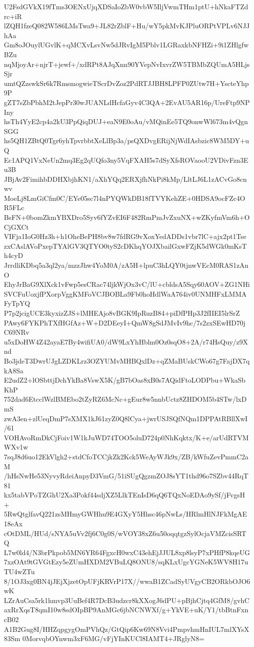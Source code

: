 U2FsdGVkX19fTms3OENxUjqXDSaIoZbW0vbW5IljVwmTHm1ptU+hNkaFTZdrc+iR
lZQH1fzeQ082W586LMsTwa9+JL82rZblF+Hu/wY5pkMvKJPluORPtVPLv6NJJhAa
Gm8oJOuylUGvlK+qMCXvLsvNw5dJRvIgM5Pblv1LGRaxkbNFHZi+9i1ZHlgfwBZu
nqMjoyAr+njrT+jewf+/xdRPt8AJqXnn90YVepNvIxvrZW5TBMbZQUmA5HLjsSjr
umtQZzswkSr6k7RmsmogwieTScrDvZoz2PdRTJJBH8LPFP0ZUtw7H+YscteYhp9P
gZT7sZbPbhM2tJepPr30wJUANLdHcfaGyv4C3QA+2EvAU5AR16p/UreFtp9NPIny
hsTh4YyE2cp4a2kU3PpQiqDUJ+eaN9E0oAu/vMQinEe5TQ9onwWl673m4vQgnSGG
hs5QH1ZBtQ0Tgr6yhTpvrbbtXeLlBp3a/psQXDvgERijNjWdIAsbzic8WM5DY+uQ
Ec1APQ1VxNeUn2mq3Eg2qUQfo3ny5VqFXAH5s7dSyXfsROVaooU2VDivFzn3Eu3B
JBjAv2FimihbDDHXbjhKN1/aXhYQq2ERXjfhNkPi8kMp/LltLJ6L1zACvGo8cnwv
MoeLj8LmGiCfm0C/EYe05sc7l4nPYQWkDB18fTVYKehZE+0HDSA9ocFZc4OR5FLc
BsFN+0bomZkmYBXDro5Syv6fYZvEI6F482RmPmJvZxuNX+wZKyfmVm6h+OCjGXCt
VIFja1IoG0Hz3h+h1OheBePH8bv8w7fdRG9vXoxYedADDs1vbr7lC+ajx2pt1Tse
zxCAslAVoPxepTYAlGV3QTYO0tyS2cDKhqYOJXbailGxwFZjK5dWGk0mKsTh4cyD
JrrdliKDbq5a3ql2ya/mzzJhw4YoM0A/zA5H+lpuC3hLQY0tjnwVEcM0RAS1zAnO
EhyJrBaG9XlXck1vFwp5esCRac74ljkWjOx3vC/lU+cbldsA5Sqy60AOV+ZG1NHi
SVCFuUoxjfPXorpVggKMFoVCJBOBLa9Fb0hoHdlWaA764iv0UNMHFxLMMAFyTpYQ
P7p2jcigUCE3kyxizZJS+lMHEAjo8vBGK9IpRuzB84+piDfPHp3J2fIIEI5lrSrZ
PAwy6FYKPhTXfHGfAz+W+D2DEeyI+QmW8gSdJMvIv9hc/7s2zxSEwHD70jC69NRv
u5xDoHW4Z42ayaE7By4wifiUA0/dW9LxYhHblm0Oz0sqO8+2A/r74HsQuy/z9Xnd
Bo3jdeT3DwrUJgLZDKLrz3OZYUMvMHBQxlDz+qZMaBUskCWo67g7FajDX7qkA8Sa
E2udZ2+lOSbttjDchYkBa8VswX5K/gB7bOas8xB0s7AQidFtoLODPbu+WkaSbKhP
752dad6EtcclWzlBMEbo2tZyRZ6McNc+gEur8w5nnbUctz8ZHDOM5b4STw/lxDmS
zwA3en+zlUeqDmP7sXMX1kJ61zyZ0Q8lCya+jwrUSJSQfNQm1DPPAtRBllXwI/61
VOHAvoRmDkCjFoiv1W1kJuWD74TOO5oluD724p0NhKqktx/K+e/arUdRTVMWXv1w
7sqJ8d6uo12EkVlgh2+stdCfoTCCjkZk2Kck5WeAyWJk9x/ZB/kWfuZevPmmC2aM
/hHsNwHe53NyvyRdeiAnpyD3VmG/51iSUgQgzmZOJ8sYT1thd96o7SZbv44RqT81
kx5tabVPoTZGhU2Xa3Pokf44sdjXZ5LlkTEnIsD6qQ6TQxNoEDAo9ySf/jFvgsH+
5RwQtglfavQ221zsMHmyGWHhu9E4GXyY5Hhsc46pNwLs/HRlmHlNJFkMgAE18eAx
cOtDML/HUd/sNYA5uVv2fj6C0g0S/wVOY38xZ6u50oqqtgzSylOcjaVMZcisSRTQ
L7w0ld4/N3brPkpob5MN6YR64FgxcH0wxC43ehEjJJUL8xp8lsyP7xPHfP8kqeUG
7xzOAt9tGVGtEzy5eZUmHXDM2VBuLQ8ONU8/sqKLxUgcYGNeK5WV8H17uTU4wZTu
8/1OJ3xg0BN4jJEjXjzetOpUFjKRVrP17X//wwaB1ZCadSyUVgyCB2ORkbOJO6wK
LZrAuCsa5rk1hmvp3UuBef4R7DcB3udzcr8kXXogJ6dPU+pBjhCjtq4GfM8/gvhC
axRrXqsT8qmI10w8sdOIpBP9AnMGc6jbNCNWXf/g+YkVE+uK/Y1/tbBtnFxncB02
A1B2Gug8I/HHZqpgygOmPVhQz/GtQip6Kw69N8Vvi4PmpvhmHnIUL7mlXYsX83Sm
0MorvqbOYnwm3xF6MG/vFjYInKUCl8IAMT4+JRglyN8=

